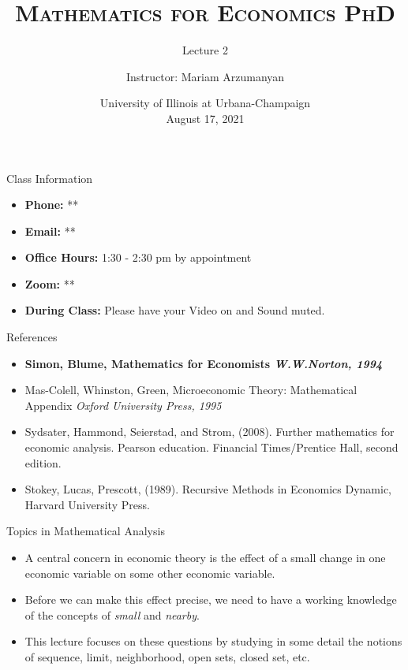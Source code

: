 \documentclass{beamer}
\title{\textsc{Mathematics for Economics PhD}}
\subtitle{Lecture 2}
\author{Instructor:  Mariam Arzumanyan}
\date[UIUC, Fall 2021]{University of Illinois at Urbana-Champaign \\August 17, 2021 }
\begin{document}
\begin{frame}
  \titlepage
\end{frame}


\begin{frame}{Class Information}
\begin{itemize}
  
    \item \textbf{Phone:} **
    \item \textbf{Email:} **
\item \textbf{Office Hours:}  1:30 - 2:30 pm  by appointment
\item \textbf{Zoom: } ** 
\item \textbf{During Class:} Please have your Video on and Sound muted. 

\end{itemize}

\end{frame}
\begin{frame}{References}
	\begin{itemize}

\item	\textbf{Simon, Blume, Mathematics for Economists \textit{W.W.Norton, 1994}}
\item	Mas-Colell, Whinston, Green, Microeconomic Theory: Mathematical Appendix \textit{Oxford University Press,  1995 }
\item		Sydsater, Hammond, Seierstad, and Strom, (2008). Further mathematics for economic analysis. Pearson education. Financial Times/Prentice Hall, second edition.
\item		Stokey, Lucas, Prescott, (1989). Recursive Methods in Economics Dynamic, Harvard University Press.

 \end{itemize}   
\end{frame}

\begin{frame}{Topics in Mathematical Analysis}
    \begin{itemize}
        \item A central concern in economic theory is the effect of a small change in one economic variable on some other economic variable. 
        \item Before we can make this effect precise, we need to have a working knowledge of the concepts of \textit{small} and \textit{nearby}. 
        \item This lecture focuses on these questions by studying in some detail the notions of sequence, limit, neighborhood, open sets, closed set, etc.
    \end{itemize}
\end{frame}
\end{document}
